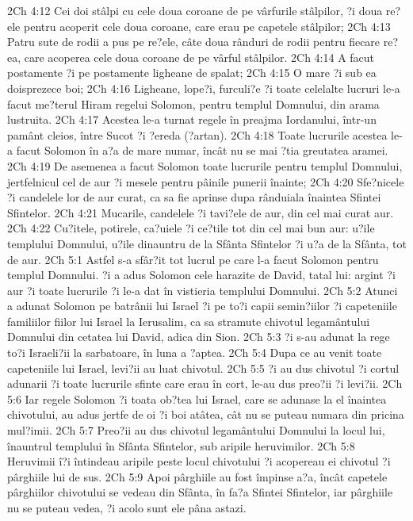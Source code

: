 2Ch 4:12  Cei doi stâlpi cu cele doua coroane de pe vârfurile stâlpilor, ?i doua re?ele pentru acoperit cele doua coroane, care erau pe capetele stâlpilor;
2Ch 4:13  Patru sute de rodii a pus pe re?ele, câte doua rânduri de rodii pentru fiecare re?ea, care acoperea cele doua coroane de pe vârful stâlpilor.
2Ch 4:14  A facut postamente ?i pe postamente ligheane de spalat;
2Ch 4:15  O mare ?i sub ea doisprezece boi;
2Ch 4:16  Ligheane, lope?i, furculi?e ?i toate celelalte lucruri le-a facut me?terul Hiram regelui Solomon, pentru templul Domnului, din arama lustruita.
2Ch 4:17  Acestea le-a turnat regele în preajma Iordanului, într-un pamânt cleios, între Sucot ?i ?ereda (?artan).
2Ch 4:18  Toate lucrurile acestea le-a facut Solomon în a?a de mare numar, încât nu se mai ?tia greutatea aramei.
2Ch 4:19  De asemenea a facut Solomon toate lucrurile pentru templul Domnului, jertfelnicul cel de aur ?i mesele pentru pâinile punerii înainte;
2Ch 4:20  Sfe?nicele ?i candelele lor de aur curat, ca sa fie aprinse dupa rânduiala înaintea Sfintei Sfintelor.
2Ch 4:21  Mucarile, candelele ?i tavi?ele de aur, din cel mai curat aur.
2Ch 4:22  Cu?itele, potirele, ca?uiele ?i ce?tile tot din cel mai bun aur: u?ile templului Domnului, u?ile dinauntru de la Sfânta Sfintelor ?i u?a de la Sfânta, tot de aur.
2Ch 5:1  Astfel s-a sfâr?it tot lucrul pe care l-a facut Solomon pentru templul Domnului. ?i a adus Solomon cele harazite de David, tatal lui: argint ?i aur ?i toate lucrurile ?i le-a dat în vistieria templului Domnului.
2Ch 5:2  Atunci a adunat Solomon pe batrânii lui Israel ?i pe to?i capii semin?iilor ?i capeteniile familiilor fiilor lui Israel la Ierusalim, ca sa stramute chivotul legamântului Domnului din cetatea lui David, adica din Sion.
2Ch 5:3  ?i s-au adunat la rege to?i Israeli?ii la sarbatoare, în luna a ?aptea.
2Ch 5:4  Dupa ce au venit toate capeteniile lui Israel, levi?ii au luat chivotul.
2Ch 5:5  ?i au dus chivotul ?i cortul adunarii ?i toate lucrurile sfinte care erau în cort, le-au dus preo?ii ?i levi?ii.
2Ch 5:6  Iar regele Solomon ?i toata ob?tea lui Israel, care se adunase la el înaintea chivotului, au adus jertfe de oi ?i boi atâtea, cât nu se puteau numara din pricina mul?imii.
2Ch 5:7  Preo?ii au dus chivotul legamântului Domnului la locul lui, înauntrul templului în Sfânta Sfintelor, sub aripile heruvimilor.
2Ch 5:8  Heruvimii î?i întindeau aripile peste locul chivotului ?i acopereau ei chivotul ?i pârghiile lui de sus.
2Ch 5:9  Apoi pârghiile au fost împinse a?a, încât capetele pârghiilor chivotului se vedeau din Sfânta, în fa?a Sfintei Sfintelor, iar pârghiile nu se puteau vedea, ?i acolo sunt ele pâna astazi.
